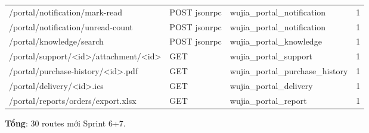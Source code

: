 \begin{tabular}{p{4.5cm}lll}
/portal/notification/mark-read & POST jsonrpc & wujia\_portal\_notification & 1 \\
/portal/notification/unread-count & POST jsonrpc & wujia\_portal\_notification & 1 \\
/portal/knowledge/search & POST jsonrpc & wujia\_portal\_knowledge & 1 \\
/portal/support/<id>/attachment/<id> & GET & wujia\_portal\_support & 1 \\
/portal/purchase-history/<id>.pdf & GET & wujia\_portal\_purchase\_history & 1 \\
/portal/delivery/<id>.ics & GET & wujia\_portal\_delivery & 1 \\
/portal/reports/orders/export.xlsx & GET & wujia\_portal\_report & 1 \\
\bottomrule
\end{tabular}

\textbf{Tổng}: 30 routes mới Sprint 6+7.
